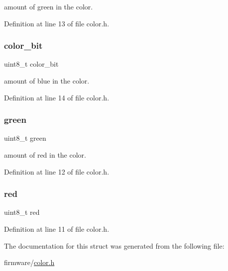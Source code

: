 amount of green in the color. 

Definition at line 13 of file color.\+h.

\hypertarget{structled__color__t_a20303e3baf7a44885164f4a273c8b23d}{}\label{structled__color__t_a20303e3baf7a44885164f4a273c8b23d} 
\subsubsection{\texorpdfstring{color\+\_\+bit}{color\_bit}}
{\footnotesize\ttfamily uint8\+\_\+t color\+\_\+bit}

amount of blue in the color. 

Definition at line 14 of file color.\+h.

\hypertarget{structled__color__t_a90d21fa503b626c00cdc8d94863d5877}{}\label{structled__color__t_a90d21fa503b626c00cdc8d94863d5877} 
\subsubsection{\texorpdfstring{green}{green}}
{\footnotesize\ttfamily uint8\+\_\+t green}

amount of red in the color. 

Definition at line 12 of file color.\+h.

\hypertarget{structled__color__t_ad47d918910aaa51c73160ac85999d09c}{}\label{structled__color__t_ad47d918910aaa51c73160ac85999d09c} 
\subsubsection{\texorpdfstring{red}{red}}
{\footnotesize\ttfamily uint8\+\_\+t red}



Definition at line 11 of file color.\+h.



The documentation for this struct was generated from the following file\+:\begin{DoxyCompactItemize}
\item 
firmware/\hyperlink{color_8h}{color.\+h}\end{DoxyCompactItemize}
